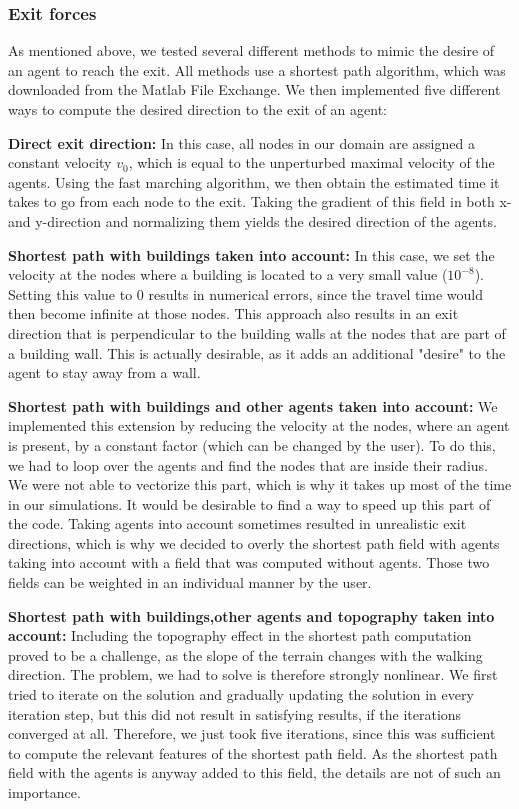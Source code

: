 \documentclass[11pt]{article}
\begin{document}
\subsubsection{Exit forces}
As mentioned above, we tested several different methods to mimic the desire of an agent to reach the exit. All methods use a shortest path algorithm, which was downloaded from the Matlab File Exchange. We then implemented five different ways to compute the desired direction to the exit of an agent:
\begin{description}
\item{\textbf{Direct exit direction: }}In this case, all nodes in our domain are assigned a constant velocity $v_0$, which is equal to the unperturbed maximal velocity of the agents. Using the fast marching algorithm, we then obtain the estimated time it takes to go from each node to the exit. Taking the gradient of this field in both x- and y-direction and normalizing them yields the desired direction of the agents.
\item{\textbf{Shortest path with buildings taken into account: }} In this case, we set the velocity at the nodes where a building is located to a very small value ($10^{-8}$). Setting this value to 0 results in numerical errors, since the travel time would then become infinite at those nodes. This approach also results in an exit direction that is perpendicular to the building walls at the nodes that are part of a building wall. This is actually desirable, as it adds an additional "desire" to the agent to stay away from a wall.
\item{\textbf{Shortest path with buildings and other agents taken into account: }} We implemented this extension by reducing the velocity at the nodes, where an agent is present, by a constant factor (which can be changed by the user). To do this, we had to loop over the agents and find the nodes that are inside their radius. We were not able to vectorize this part, which is why it takes up most of the time in our simulations. It would be desirable to find a way to speed up this part of the code. Taking agents into account sometimes resulted in unrealistic exit directions, which is why we decided to overly the shortest path field with agents taking into account with a field that was computed without agents. Those two fields can be weighted in an individual manner by the user.
\item{\textbf{Shortest path with buildings,other agents and topography taken into account: }}Including the topography effect in the shortest path computation proved to be a challenge, as the slope of the terrain changes with the walking direction. The problem, we had to solve is therefore strongly nonlinear. We first tried to iterate on the solution and gradually updating the solution in every iteration step, but this did not result in satisfying results, if the iterations converged at all. Therefore, we just took five iterations, since this was sufficient to compute the relevant features of the shortest path field. As the shortest path field with the agents is anyway added to this field, the details are not of such an importance.

\end{description}
\end{document}
